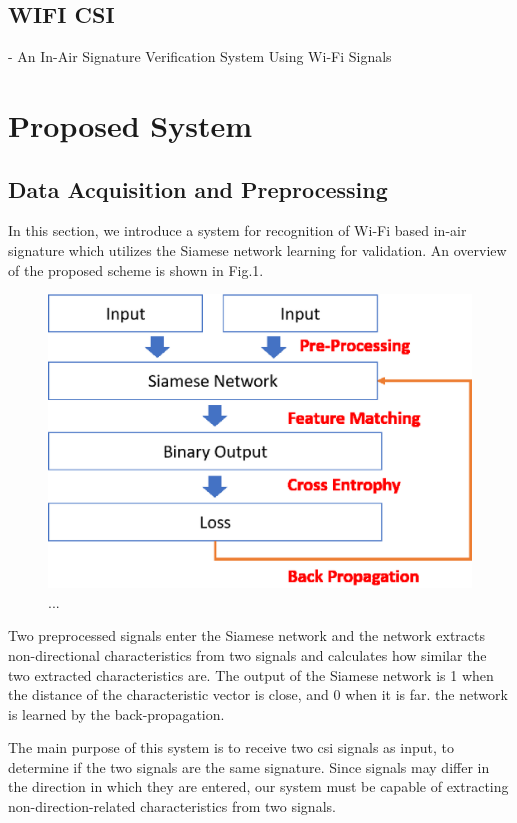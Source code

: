 \documentclass[runningheads]{llncs}
\begin{document}
\subsection{WIFI CSI}
- An In-Air Signature Verification System Using Wi-Fi Signals 

\section{Proposed System}
\subsection{Data Acquisition and Preprocessing}
In this section, we introduce a system for recognition of Wi-Fi based in-air signature which utilizes the Siamese network learning for validation.
An overview of the proposed scheme is shown in Fig.1.
\begin{figure}
\includegraphics[width=\textwidth]{methods1.eps}
\caption{...} \label{method1}
\end{figure}

 Two preprocessed signals enter the Siamese network and the network 
extracts non-directional characteristics from two signals and calculates how similar the two extracted characteristics are.
 The output of the Siamese network is 1 when the distance of the characteristic vector is close, and 0 when it is far.
the network is learned by the back-propagation.

The main purpose of this system is to receive two csi signals as input, to determine if the two signals are the same signature.
Since signals may differ in the direction in which they are entered, our system must be capable of extracting non-direction-related characteristics from two signals.
\end{document}

